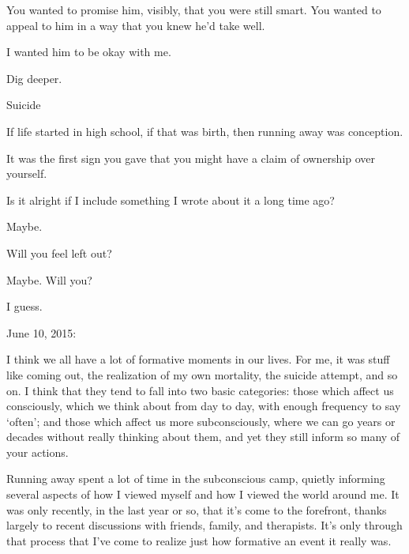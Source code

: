 \begin{paracol}{2}
\begin{leftcolumn}
\begin{ally}
You wanted to promise him, visibly, that you were still smart. You wanted to appeal to him in a way that you knew he'd take well.
\end{ally}
I wanted him to be okay with me.

\begin{ally}
Dig deeper.
\end{ally}
\newpage

Suicide

If life started in high school, if that was birth, then running away was conception.

\begin{ally}
It was the first sign you gave that you might have a claim of ownership over yourself.
\end{ally}
Is it alright if I include something I wrote about it a long time ago?

\begin{ally}
Maybe.
\end{ally}
Will you feel left out?

\begin{ally}
Maybe. Will you?
\end{ally}
I guess.

June 10, 2015:


I think we all have a lot of formative moments in our lives. For me, it was stuff like coming out, the realization of my own mortality, the suicide attempt, and so on. I think that they tend to fall into two basic categories: those which affect us consciously, which we think about from day to day, with enough frequency to say `often'; and those which affect us more subconsciously, where we can go years or decades without really thinking about them, and yet they still inform so many of your actions.

Running away spent a lot of time in the subconscious camp, quietly informing several aspects of how I viewed myself and how I viewed the world around me. It was only recently, in the last year or so, that it's come to the forefront, thanks largely to recent discussions with friends, family, and therapists. It's only through that process that I've come to realize just how formative an event it really was.


\end{leftcolumn}
\end{paracol}
